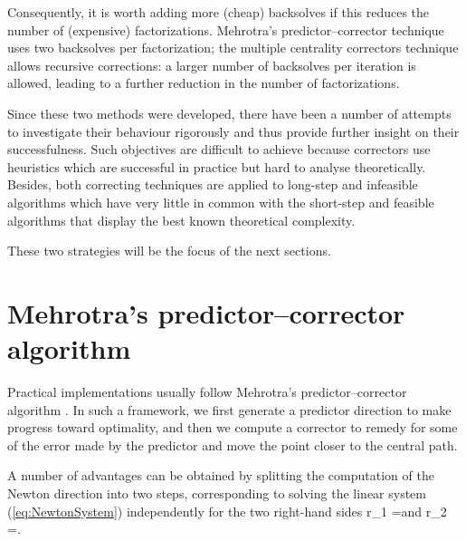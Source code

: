 
Consequently, it is worth adding more (cheap) 
backsolves if this reduces the number of (expensive) factorizations. 
Mehrotra's predictor--corrector technique \cite{Mehrotra92} uses two 
backsolves per factorization; the multiple centrality correctors technique
\cite{Gondzio96} allows recursive corrections: a larger number 
of backsolves per iteration is allowed, leading to a further reduction 
in the number of factorizations. 

Since these two methods were developed, there have been a number of 
attempts to investigate their behaviour rigorously and thus provide
further insight on their successfulness. 
Such objectives are difficult to achieve because 
correctors use heuristics which are successful in practice but hard 
to analyse theoretically. 
Besides, both correcting techniques are applied to long-step and infeasible 
algorithms which have very little in common with the short-step and 
feasible algorithms that display the best known theoretical complexity.

These two strategies will be the focus of the next sections.


%
%
\section{Mehrotra's predictor--corrector algorithm}
\label{sec:MehrotraPC}

Practical implementations usually follow Mehrotra's predictor--corrector 
algorithm \cite{Mehrotra92}. In such a framework, we first generate a 
predictor direction to make progress toward optimality, and then we 
compute a corrector to remedy for some of the error made by the predictor
and move the point closer to the central path.

A number of advantages can be obtained by splitting the computation 
of the Newton direction into two steps, corresponding to solving the linear
system (\ref{eq:NewtonSystem}) independently for the two right-hand 
sides 
\be \label{eq:PredictorRhs}
r_1 = \quad \mbox{and} \quad
r_2 =\left[ 
  \begin{array}{c}
    0 \\ 0 \\ \mu e
  \end{array} \right].
\ee

